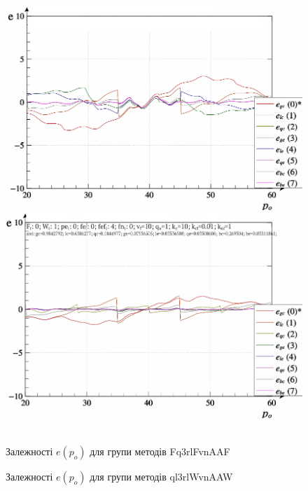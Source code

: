 \documentclass[14pt,handout,utf8]{beamer}
\newlength\DDP
\begin{document}
\begin{frame}
  \begin{figure}[htb!]
    \begin{center}
      ~ \hfill
      \includegraphics[width=\DDP]{../p3/p/scan/qls-p_p_e_Fq3rlFvnAAF_scan_xl.png}
      \hfill
      \includegraphics[width=\DDP]{../p3/p/scan/qls-p_p_e_ql3rlWvnAAW_scan_xl.png}
      \hfill ~
    \end{center}
    \parbox[t]{\DDP} {
      \caption{Залежності $e (p_o)$ для групи методів Fq3rlFvnAAF}
    \label{atu:f:Fq3rlFvnAAF_scan}
  } \hfill
    \parbox[t]{\DDP} {
      \caption{Залежності $e (p_o)$ для групи методів ql3rlWvnAAW}
    \label{atu:f:ql3rlWvnAAW_scan}
  }
  \end{figure}

\end{frame}


\end{document}
